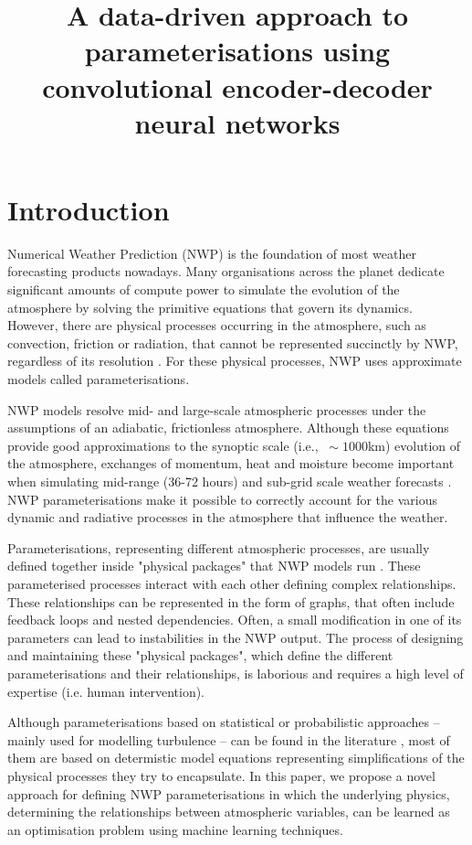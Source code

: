 \documentclass[twocol]{ametsoc}
\title{A data-driven approach to parameterisations using convolutional encoder-decoder neural networks}
\affiliation{Fenner School of Environment \& Society, The Australian National University, Canberra, Australia}
\begin{document}
\maketitle


%
\section{Introduction}

Numerical Weather Prediction (NWP) is the foundation of most weather forecasting products nowadays. Many organisations across the planet dedicate significant amounts of compute power to simulate the evolution of the atmosphere by solving the primitive equations that govern its dynamics. However, there are physical processes occurring in the atmosphere, such as convection, friction or radiation, that cannot be represented succinctly by NWP, regardless of its resolution \citep{stensrud2009parameterization}. For these physical processes, NWP uses approximate models called parameterisations.

NWP models resolve mid- and large-scale atmospheric processes under the assumptions of an adiabatic, frictionless atmosphere. Although these equations provide good approximations to the synoptic scale (i.e., $~\sim 1000$km) evolution of the atmosphere, exchanges of momentum, heat and moisture become important when simulating mid-range (36-72 hours) and sub-grid scale weather forecasts \citep{coiffier2011fundamentals}. NWP parameterisations make it possible to correctly account for the various dynamic and radiative processes in the atmosphere that influence the weather.

Parameterisations, representing different atmospheric processes, are usually defined together inside "physical packages" that NWP models run \citep{LTG-81}. These parameterised processes interact with each other defining complex relationships. These relationships can be represented in the form of graphs, that often include feedback loops and nested dependencies. Often, a small modification in one of its parameters can lead to instabilities in  the NWP output. The process of designing and maintaining these "physical packages", which define the different parameterisations and their relationships, is laborious and requires a high level of expertise (i.e. human intervention).

Although parameterisations based on statistical or probabilistic approaches -- mainly used for modelling turbulence -- can be found in the literature \citep{berner2017stochastic}, most of them are based on determistic model equations representing simplifications of the physical processes they try to encapsulate. In this paper, we propose a novel approach for defining NWP parameterisations in which the underlying physics, determining the relationships between atmospheric variables, can be learned as an optimisation problem using machine learning techniques.
\end{document}
